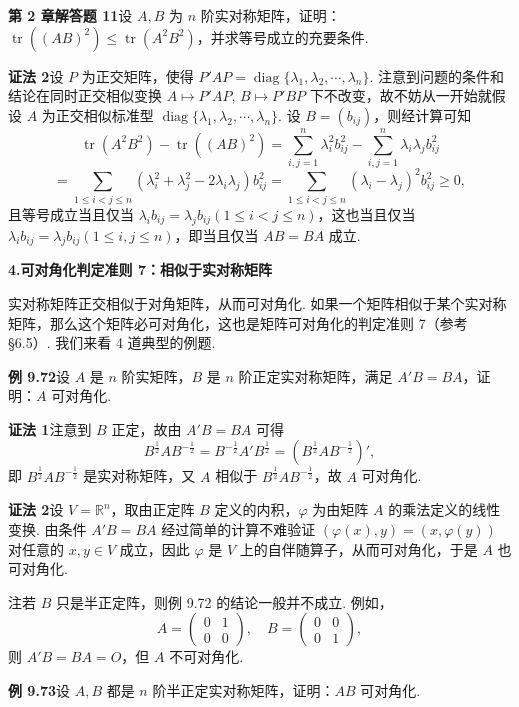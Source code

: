 \documentclass[UTF8, 12pt, fontset=fandol, oneside]{ctexart}
\begin{document}
\noindent\textbf{第 2 章解答题 11}\quad 设 $A,B$ 为 $n$ 阶实对称矩阵，证明：$\operatorname{tr}((AB)^2)\le\operatorname{tr}(A^2B^2)$，并求等号成立的充要条件.

\noindent\textbf{证法 2}\quad 设 $P$ 为正交矩阵，使得 $P'AP=\operatorname{diag}\{\lambda_1,\lambda_2,\cdots,\lambda_n\}$. 注意到问题的条件和结论在同时正交相似变换 $A\mapsto P'AP$, $B\mapsto P'BP$ 下不改变，故不妨从一开始就假设 $A$ 为正交相似标准型 $\operatorname{diag}\{\lambda_1,\lambda_2,\cdots,\lambda_n\}$. 设 $B=(b_{ij})$，则经计算可知
\[
\operatorname{tr}(A^2B^2)-\operatorname{tr}((AB)^2)
=\sum_{i,j=1}^n\lambda_i^2b_{ij}^2-\sum_{i,j=1}^n\lambda_i\lambda_jb_{ij}^2
\]
\[
=\sum_{1\le i<j\le n}(\lambda_i^2+\lambda_j^2-2\lambda_i\lambda_j)b_{ij}^2
=\sum_{1\le i<j\le n}(\lambda_i-\lambda_j)^2b_{ij}^2\ge0,
\]
且等号成立当且仅当 $\lambda_ib_{ij}=\lambda_jb_{ij}(1\le i<j\le n)$，这也当且仅当 $\lambda_ib_{ij}=\lambda_jb_{ij}(1\le i,j\le n)$，即当且仅当 $AB=BA$ 成立.

\noindent\textbf{4.\quad 可对角化判定准则 7：相似于实对称矩阵}

实对称矩阵正交相似于对角矩阵，从而可对角化. 如果一个矩阵相似于某个实对称矩阵，那么这个矩阵必可对角化，这也是矩阵可对角化的判定准则 7（参考 §6.5）. 我们来看 4 道典型的例题.

\noindent\textbf{例 9.72}\quad 设 $A$ 是 $n$ 阶实矩阵，$B$ 是 $n$ 阶正定实对称矩阵，满足 $A'B=BA$，证明：$A$ 可对角化.

\noindent\textbf{证法 1}\quad 注意到 $B$ 正定，故由 $A'B=BA$ 可得
\[
B^{\frac12}AB^{-\frac12}=B^{-\frac12}A'B^{\frac12}=(B^{\frac12}AB^{-\frac12})',
\]
即 $B^{\frac12}AB^{-\frac12}$ 是实对称矩阵，又 $A$ 相似于 $B^{\frac12}AB^{-\frac12}$，故 $A$ 可对角化.

\noindent\textbf{证法 2}\quad 设 $V=\mathbb{R}^n$，取由正定阵 $B$ 定义的内积，$\varphi$ 为由矩阵 $A$ 的乘法定义的线性变换. 由条件 $A'B=BA$ 经过简单的计算不难验证 $(\varphi(x),y)=(x,\varphi(y))$ 对任意的 $x,y\in V$ 成立，因此 $\varphi$ 是 $V$ 上的自伴随算子，从而可对角化，于是 $A$ 也可对角化.

注\quad 若 $B$ 只是半正定阵，则例 9.72 的结论一般并不成立. 例如，
\[
A=\begin{pmatrix}0&1\\0&0\end{pmatrix},\quad
B=\begin{pmatrix}0&0\\0&1\end{pmatrix},
\]
则 $A'B=BA=O$，但 $A$ 不可对角化.

\noindent\textbf{例 9.73}\quad 设 $A,B$ 都是 $n$ 阶半正定实对称矩阵，证明：$AB$ 可对角化.
\end{document}
